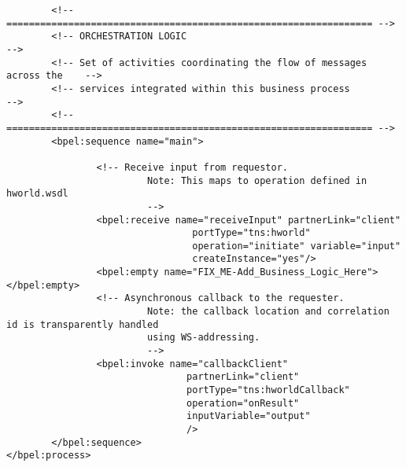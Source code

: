\begin{verbatim}
		<!-- ================================================================= -->         
		<!-- ORCHESTRATION LOGIC                                               -->
		<!-- Set of activities coordinating the flow of messages across the    -->
		<!-- services integrated within this business process                  -->
		<!-- ================================================================= -->         
		<bpel:sequence name="main">
				
				<!-- Receive input from requestor. 
						 Note: This maps to operation defined in hworld.wsdl 
						 -->
				<bpel:receive name="receiveInput" partnerLink="client"
								 portType="tns:hworld"
								 operation="initiate" variable="input"
								 createInstance="yes"/>
				<bpel:empty name="FIX_ME-Add_Business_Logic_Here"></bpel:empty>
				<!-- Asynchronous callback to the requester.
						 Note: the callback location and correlation id is transparently handled 
						 using WS-addressing.
						 -->
				<bpel:invoke name="callbackClient" 
								partnerLink="client"
								portType="tns:hworldCallback"
								operation="onResult" 
								inputVariable="output"
								/>
		</bpel:sequence>
</bpel:process>
\end{verbatim}